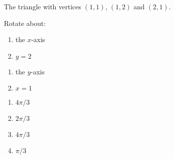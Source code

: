 {The triangle with vertices $(1,1)$, $(1,2)$ and $(2,1)$.

Rotate about:

\noindent%
\begin{minipage}[t]{.5\linewidth}
\begin{enumerate}
\item		the $x$-axis
\item		$y=2$
\end{enumerate}
\end{minipage}
\begin{minipage}[t]{.5\linewidth}
\begin{enumerate}\addtocounter{enumii}{2}
\item		the $y$-axis
\item		$x=1$
\end{enumerate}
\end{minipage}
}
{\begin{enumerate}
\item $4\pi/3$
\item $2\pi/3$
\item $4\pi/3$
\item $\pi/3$
\end{enumerate}
}
